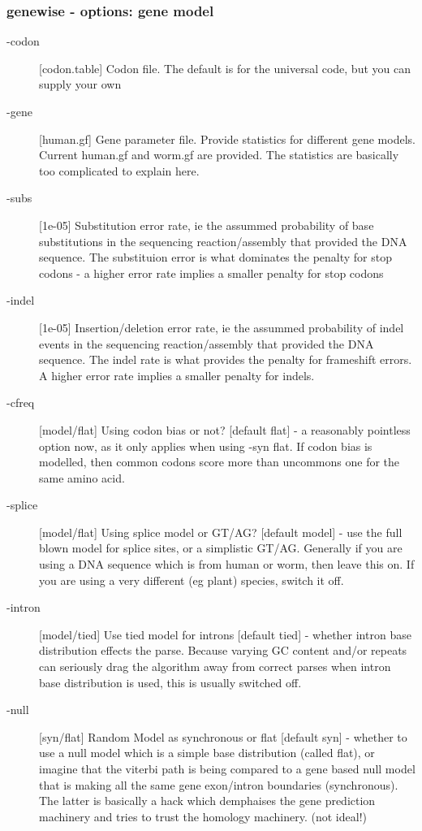 \documentclass{article}
\begin{document}
\subsubsection{genewise - options: gene model}

\begin{description}
\item[-codon] [codon.table] Codon file. The default is for the
universal code, but you can supply your own
\item[-gene] [human.gf] Gene parameter file. Provide statistics for
different gene models. Current human.gf and worm.gf are provided. The
statistics are basically too complicated to explain here.
\item[-subs] [1e-05] Substitution error rate, ie the assummed
probability of base substitutions in the sequencing reaction/assembly
that provided the DNA sequence. The substituion error is what
dominates the penalty for stop codons - a higher error rate implies a
smaller penalty for stop codons
\item[-indel] [1e-05] Insertion/deletion error rate, ie the assummed
probability of indel events in the sequencing reaction/assembly that
provided the DNA sequence. The indel rate is what provides the penalty
for frameshift errors. A higher error rate implies a smaller penalty
for indels.
\item[-cfreq] [model/flat] Using codon bias or not?  [default flat] -
a reasonably pointless option now, as it only applies when using -syn
flat. If codon bias is modelled, then common codons score more than
uncommons one for the same amino acid.
\item[-splice] [model/flat] Using splice model or GT/AG? [default
model] - use the full blown model for splice sites, or a simplistic
GT/AG. Generally if you are using a DNA sequence which is from human
or worm, then leave this on. If you are using a very different (eg
plant) species, switch it off.
\item[-intron] [model/tied] Use tied model for introns [default tied]
- whether intron base distribution effects the parse. Because varying
GC content and/or repeats can seriously drag the algorithm away from
correct parses when intron base distribution is used, this is usually
switched off.
\item[-null] [syn/flat] Random Model as synchronous or flat [default
syn] - whether to use a null model which is a simple base distribution
(called flat), or imagine that the viterbi path is being compared to a
gene based null model that is making all the same gene exon/intron
boundaries (synchronous). The latter is basically a hack which
demphaises the gene prediction machinery and tries to trust the
homology machinery. (not ideal!)


\end{description}
\end{document}
